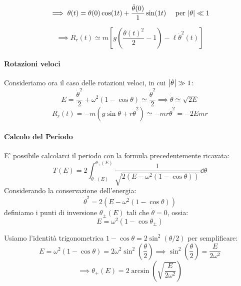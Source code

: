 \begin{example}
    \begin{equation}
        \implies \theta(t) = \theta(0)\cos(1 t) + \frac{\dot{\theta}(0)}{1} \sin(1 t) \quad \text{ per } \abs{\theta}\ll 1
    \end{equation}

    \begin{equation}
        \implies R_r(t) \simeq m\left[ g\left( \frac{\theta(t)^2}{2} - 1 \right) - \ell \dot{\theta}^2(t) \right]
    \end{equation}

    \paragraph{Rotazioni veloci}
    Consideriamo ora il caso delle rotazioni veloci, in cui $\abs{\dot{\theta}}\gg1$:
    \begin{equation*}
        E = \frac{\dot{\theta}^2}{2} + \omega^2 (1 - \cos \theta) \simeq \frac{\dot{\theta}^2}{2}
        \implies \dot{\theta} \simeq \sqrt{2E}
    \end{equation*}
    \begin{equation}
        R_r(t) = -m \left( g \sin \theta + r \dot{\theta}^2 \right) \simeq -m r \dot{\theta}^2 = -2Emr
    \end{equation}

    \paragraph{Calcolo del Periodo}
    E' possibile calcolarci il periodo con la formula precedentemente ricavata:
    \begin{equation}
        T(E) = 2 \int_{\theta_-(E )}^{\theta_+(E)} \frac{1}{\sqrt{2\left( E - \omega^2(1 - \cos \theta) \right)}} \dd{\theta}
    \end{equation}
    Considerando la conservazione dell'energia:
    \begin{equation*}
        \dot{\theta}^2 = 2\left( E - \omega^2 (1 - \cos \theta) \right)
    \end{equation*}
    definiamo i punti di inversione $\theta_\pm(E)$ tali che $\dot{\theta} = 0$, ossia:
    \begin{equation}
        E = \omega^2(1 - \cos \theta_\pm)
    \end{equation}

    Usiamo l'identità trigonometrica $1 - \cos \theta = 2 \sin^2(\theta/2)$ per semplificare:
    \begin{equation*}
        E = \omega^2(1 - \cos \theta) = 2 \omega^2 \sin^2\left( \frac{\theta}{2} \right)
        \implies \sin^2\left( \frac{\theta}{2} \right) = \frac{E}{2\omega^2}
    \end{equation*}
    \begin{equation}
        \implies \theta_+(E) = 2 \arcsin\left( \sqrt{\frac{E}{2\omega^2}} \right)
    \end{equation}

\end{example}

